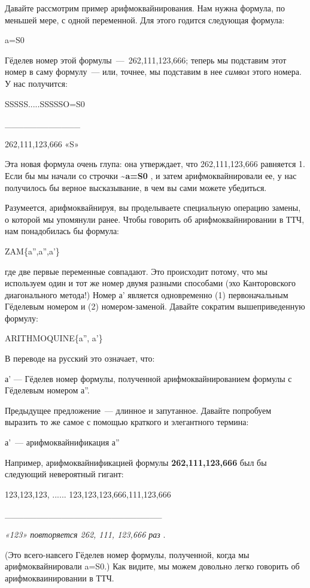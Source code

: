 \documentclass[../main.tex]{subfiles}
\begin{document}
Давайте рассмотрим пример арифмоквайнирования. Нам нужна формула, по меньшей мере, с одной переменной. Для этого годится следующая формула:

a=S0

Гёделев номер этой формулы~---~262,111,123,666; теперь мы подставим этот номер в саму формулу~--- или, точнее, мы подставим в нее \emph{символ} этого номера. У нас получится:

SSSSS.....SSSSSO=S0

\textbar\_\_\_\_\_\_\_\_\_\_\_\_\textbar{}

262,111,123,666 «S»

Эта новая формула очень глупа: она утверждает, что 262,111,123,666 равняется 1. Если бы мы начали со строчки \textbf{\textasciitilde a=S0} , и затем арифмоквайнировали ее, у нас получилось бы верное высказывание, в чем вы сами можете убедиться.

Разумеется, арифмоквайнируя, вы проделываете специальную операцию замены, о которой мы упомянули ранее. Чтобы говорить об арифмоквайнировании в ТТЧ, нам понадобилась бы формула:

ZAM\{a'',a'',a'\}

где две первые переменные совпадают. Это происходит потому, что мы используем один и тот же номер двумя разными способами (эхо Канторовского диагонального метода!) Номер а' является одновременно (1) первоначальным Гёделевым номером и (2) номером-заменой. Давайте сократим вышеприведенную формулу:

ARITHMOQUINE\{a'', a'\}

В переводе на русский это означает, что:

а' --- Гёделев номер формулы, полученной арифмоквайнированием формулы с Гёделевым номером а''.

Предыдущее предложение~--- длинное и запутанное. Давайте попробуем выразить то же самое с помощью краткого и элегантного термина:

а'~--- арифмоквайнификация а''

Например, арифмоквайнификацией формулы \textbf{262,111,123,666} был бы следующий невероятный гигант:

123,123,123, ...... 123,123,123,666,111,123,666

\textbar\_\_\_\_\_\_\_\_\_\_\_\_\_\_\_\_\_\_\_\_\_\_\_\_\_\textbar{}

\emph{«123» повторяется 262, 111, 123,666 раз} .

(Это всего-навсего Гёделев номер формулы, полученной, когда мы арифмоквайнировали a=S0.) Как видите, мы можем довольно легко говорить об арифмокваинировании в ТТЧ.
\end{document}
